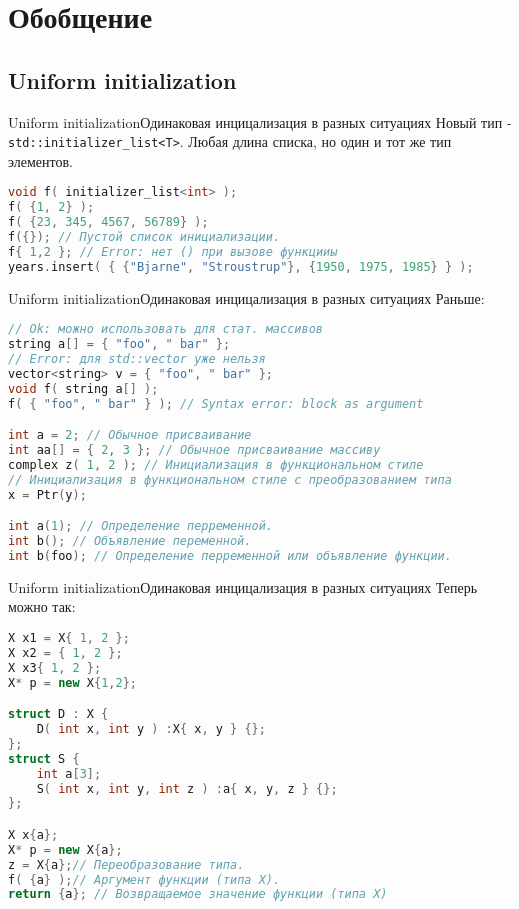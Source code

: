 \documentclass[10pt]{beamer}
\begin{document}
\section{Обобщение}
\subsection{Uniform initialization}
\hypertarget{Uniform initialization}{}
\begin{frame}[fragile]{Uniform initialization}{Одинаковая инцицализация в разных ситуациях}
Новый тип - \texttt{std::initializer\_list<T>}. Любая длина списка, но один и тот же тип элементов.
\begin{lstlisting}[language=C++]
void f( initializer_list<int> );
f( {1, 2} );
f( {23, 345, 4567, 56789} );
f({}); // Пустой список инициализации.
f{ 1,2 }; // Error: нет () при вызове функцииы
years.insert( { {"Bjarne", "Stroustrup"}, {1950, 1975, 1985} } );
\end{lstlisting}
\end{frame}

\begin{frame}[fragile]{Uniform initialization}{Одинаковая инцицализация в разных ситуациях}
Раньше:
\begin{lstlisting}[language=C++]
// Ok: можно использовать для стат. массивов
string a[] = { "foo", " bar" }; 
// Error: для std::vector уже нельзя
vector<string> v = { "foo", " bar" }; 
void f( string a[] );
f( { "foo", " bar" } ); // Syntax error: block as argument

int a = 2; // Обычное присваивание
int aa[] = { 2, 3 }; // Обычное присваивание массиву
complex z( 1, 2 ); // Инициализация в функциональном стиле
// Инициализация в функциональном стиле с преобразованием типа
x = Ptr(y); 

int a(1); // Определение перременной.
int b(); // Объявление переменной.
int b(foo); // Определение перременной или объявление функции.
\end{lstlisting}
\end{frame}

\begin{frame}[fragile]{Uniform initialization}{Одинаковая инцицализация в разных ситуациях}
Теперь можно так:
\begin{lstlisting}[language=C++]
X x1 = X{ 1, 2 }; 
X x2 = { 1, 2 };
X x3{ 1, 2 }; 
X* p = new X{1,2}; 

struct D : X {
    D( int x, int y ) :X{ x, y } {};
};
struct S {
    int a[3];
    S( int x, int y, int z ) :a{ x, y, z } {};
};

X x{a}; 
X* p = new X{a};
z = X{a};// Переобразование типа.
f( {a} );// Аргумент функции (типа X).
return {a}; // Возвращаемое значение функции (типа X)
\end{lstlisting}
\end{frame}
\end{document}
